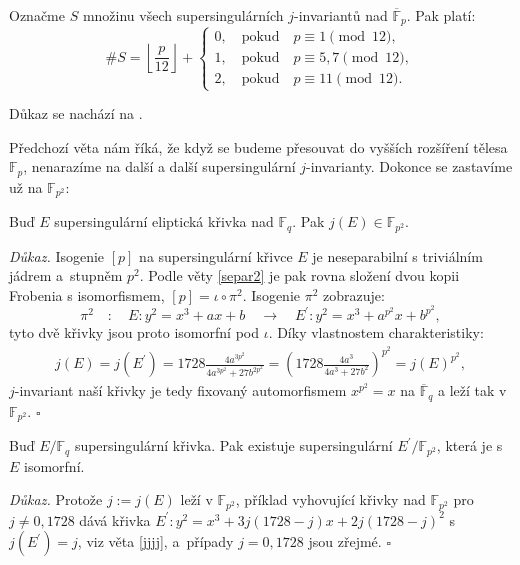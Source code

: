 \documentclass[12pt]{report}
\begin{document}
\begin{veta}
Označme $S$ množinu všech supersingulárních $j$-invariantů nad $\overline{\mathbb{F}}_{p}$. Pak platí:
\begin{equation*}
\# S = \left\lfloor \frac{p}{12} \right\rfloor + \begin{cases}
 0, \quad \text{pokud} \quad p \equiv 1 \pmod{12},\\
 1, \quad \text{pokud} \quad p \equiv 5,7 \pmod{12},\\
 2, \quad \text{pokud} \quad p \equiv 11 \pmod{12}.
 \end{cases}
\end{equation*}
\end{veta}

Důkaz se nachází na \cite[Cor. 4.40]{Washington}.

Předchozí věta nám říká, že když se budeme přesouvat do vyšších rozšíření tělesa $\mathbb{F}_p$, nenarazíme na další a další supersingulární $j$-invarianty. Dokonce se zastavíme už na $\mathbb{F}_{p^2}$:

\begin{veta}
Buď $E$ supersingulární eliptická křivka nad $\mathbb{F}_q$. Pak $j(E) \in \mathbb{F}_{p^2}$.
\end{veta}
\noindent \textit{Důkaz.} Isogenie $[p]$ na supersingulární křivce $E$ je neseparabilní s triviálním jádrem a~stupněm $p^2$. Podle věty \ref{separ2} je pak rovna složení dvou kopii Frobenia s isomorfismem, $[p] = \iota \circ \pi ^2$. Isogenie $\pi^2$ zobrazuje:
\begin{equation*}
\pi^2 \quad : \quad E: y^2 = x^3+ax+b  \quad \longrightarrow \quad E^\prime : y^2 = x^3 + a^{p^2}x + b^{p^2},
\end{equation*}
tyto dvě křivky jsou proto isomorfní pod $\iota$. Díky vlastnostem charakteristiky:
\begin{align*}
 j(E) = j(E^\prime) = 1728 \frac{4 a^{3 p^2}}{4 a^{3 p^2} + 27 b^{2 p^2}} = \left( 1728 \frac{4 a^3}{4a^3+27b^2} \right)^{p^2} = j(E)^{p^2},
\end{align*}
$j$-invariant naší křivky je tedy fixovaný automorfismem $x^{p^2} = x$ na $\overline{\mathbb{F}}_q$ a leží tak v $\mathbb{F}_{p^2}$. \hfill $\square$\\

\begin{dusledek}\label{Fp2}
Buď $E/\mathbb{F}_q$ supersingulární křivka. Pak existuje supersingulární $E^\prime/\mathbb{F}_{p^2}$, která je s $E$ isomorfní.
\end{dusledek}
\noindent \textit{Důkaz.} Protože $j := j(E)$ leží v $\mathbb{F}_{p^2}$, příklad vyhovující křivky nad $\mathbb{F}_{p^2}$ pro $j \neq 0,1728$ dává křivka $E^\prime : y^2 = x^3 +3j(1728-j)x + 2j(1728-j)^2$ s $j(E^\prime) = j$, viz věta \ref{jjjj}, a~případy $j = 0,1728$ jsou zřejmé. \hfill $\square$\\
\end{document}
